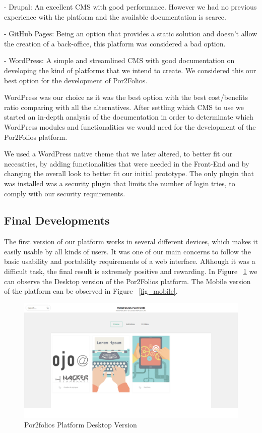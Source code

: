 \documentclass[a4paper,12pt,journal,twoside,compsoc]{PPIEEEtran}
\begin{document}
- Drupal: An excellent \ac{CMS} with good performance. However we had no previous experience with the platform and the available documentation is scarce.

- GitHub Pages: Being an option that provides a static solution and doesn't allow the creation of a back-office, this platform was considered a bad option.

- WordPress: A simple and streamlined \ac{CMS} with good documentation on developing the kind of platforms that we intend to create. We considered this our best option for the development of Por2Folios.

WordPress was our choice as it was the best option with the best cost/benefits ratio comparing with all the alternatives. After settling which \ac{CMS} to use we started an in-depth analysis of the documentation in order to determinate which WordPress modules and functionalities we would need for the development of the Por2Folios platform.

We used a WordPress native theme that we later altered, to better fit our necessities, by adding functionalities that were needed in the Front-End and by changing the overall look to better fit our initial prototype. The only plugin that was installed was a security plugin that limits the number of login tries, to comply with our security requirements.

\clearpage

\subsection{Final Developments}

The first version of our platform works in several different devices, which makes it easily usable by all kinds of users. It was one of our main concerns to follow the basic usability and portability requirements of a web interface. Although it was a difficult task, the final result is extremely positive and rewarding. In Figure ~\ref{fig_browser} we can observe the Desktop version of the Por2Folios platform. The Mobile version of the platform can be observed in Figure ~\ref{fig_mobile}.

\begin{figure}[htb]
\centering
\includegraphics[width=1\linewidth]{desktop.png}
\caption{Por2folios Platform Desktop Version}
\label{fig_browser}
\end{figure}
\end{document}
